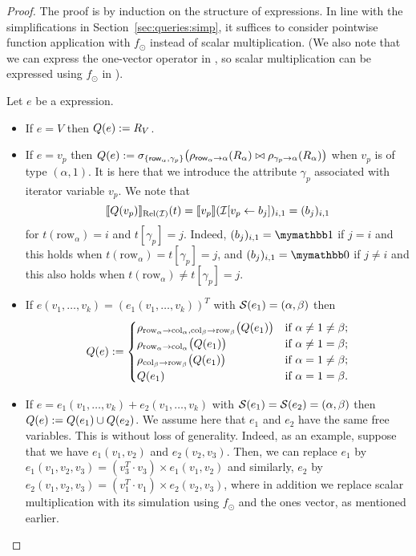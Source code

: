 \begin{proof}
The proof is by induction on the structure of \langsum expressions. In line with the simplifications in Section~\ref{sec:queries:simp}, it suffices to consider pointwise function application with $f_\odot$ instead of scalar multiplication. (We also note that we can express the one-vector operator in \langsum, so scalar multiplication can be expressed using $f_\odot$ in \langsum).

Let $e$ be a \langsum expression.
\begin{itemize}
  \item If $e=V$ then $Q (e):=R_V$.
  \item If $e=v_p$ then $Q (e):=\sigma_{\lbrace \mathsf{row}_\alpha,\gamma_p\rbrace}\bigl(\rho_{\mathsf{row}_\alpha\to \alpha}(R_\alpha)\bowtie \rho_{\gamma_p\to \alpha}(R_\alpha)\bigr)$ when  $v_p$ is of type $(\alpha,1)$. It is here that we introduce the attribute $\gamma_p$ associated with iterator variable $v_p$.
 We note that 
$$ \llbracket Q(v_p) \rrbracket_{\text{Rel}(\mathcal{I})}(t)=\llbracket v_p \rrbracket(\mathcal{I}[v_p\gets b_{j}])_{i,1}=(b_j)_{i,1}
$$
for $t(\mathrm{row}_\alpha)=i$ and $t[\gamma_p]=j$. Indeed, $(b_j)_{i,1}=\kone$ if $j=i$
and this holds when $t(\mathrm{row}_\alpha)=t[\gamma_p]=j$, and $(b_j)_{i,1}=\kzero$ if $j\neq i$
and this also holds when $t(\mathrm{row}_\alpha)\neq t[\gamma_p]=j$.

  \item If $e(v_1,\ldots,v_k)=(e_1(v_1,\ldots,v_k))^T$ with $\mathcal{S} (e_1)=(\alpha, \beta)$ then \[
Q(e) :=
\begin{cases}
\rho_{\mathrm{row}_\alpha \to \mathrm{col}_\alpha,\mathrm{col}_\beta \to \mathrm{row}_\beta}\bigl(Q(e_1)\bigr) & \text{if } \alpha \neq 1 \neq \beta; \cr
\rho_{\mathrm{row}_\alpha \to \mathrm{col}_\alpha}\bigl(Q(e_1)\bigr) & \text{if } \alpha \neq 1 = \beta; \cr
\rho_{\mathrm{col}_\beta \to \mathrm{row}_\beta}\bigl(Q(e_1)\bigr) & \text{if } \alpha = 1 \neq \beta; \cr
Q(e_1) & \text{if } \alpha = 1 = \beta.
\end{cases}
\]
\item If $e=e_1(v_1,\ldots,v_k)+e_2(v_1,\ldots,v_k)$ with $\mathcal{S} (e_1)=\mathcal{S} (e_2)=(\alpha, \beta)$ then $Q (e):=Q (e_1)\cup Q (e_2)$. We assume here that $e_1$ and $e_2$ have the same free variables. This is without loss of generality. Indeed, as an example, suppose that we have $e_1(v_1,v_2)$
and $e_2(v_2,v_3)$. Then, we can replace $e_1$ by  $e_1(v_1,v_2,v_3)=(v_3^T\cdot v_3)\times e_1(v_1,v_2)$
and similarly, $e_2$ by $e_2(v_1,v_2,v_3)=(v_1^T\cdot v_1)\times e_2(v_2,v_3)$, where in addition we replace scalar multiplication with its simulation using $f_{\odot}$ and the ones vector, as mentioned earlier. 


\end{itemize}
\end{proof}
